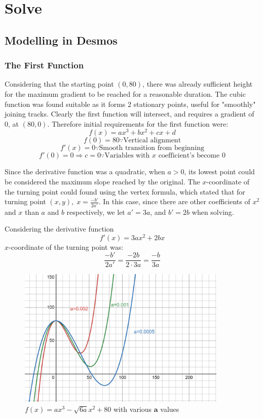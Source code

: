 \documentclass[10pt, letterpaper]{article}
\begin{document}
\section{Solve}
\subsection{Modelling in Desmos}
\subsubsection{The First Function}

Considering that the starting point $(0, 80)$, there was already sufficient height for the maximum gradient to be reached for a reasonable duration.
The cubic function was found suitable as it forms 2 stationary points, useful for "smoothly" joining tracks.
Clearly the first function will intersect, and requires a gradient of $0$, at $(80, 0)$. Therefore initial requirements for the first function were:
$$f(x)=ax^3 +bx^2 +cx +d$$
$$f(0)=80\because\textrm{Vertical alignment}$$
$$f'(x)=0 \because \textrm{Smooth transition from beginning}$$
$$f'(0)=0\Rightarrow c=0\because \textrm{Variables with } x \textrm{ coefficient's become 0}$$

Since the derivative function was a quadratic, when $a>0$, its lowest point could be considered the maximum slope reached by the original.
The $x$-coordinate of the turning point could found using the vertex formula, which stated that for turning point $(x, y),\; x=\frac{-b'}{2a'}$. In this case, since there are other coefficients of $x^2$ and $x$ than $a$ and $b$ respectively, we let $a'=3a$, and $b'=2b$ when solving.

Considering the derivative function
 $$f'(x)=3ax^2+2bx$$
 $x$-coordinate of the turning point was: 
 $$\frac{-b'}{2a'}=\frac{-2b}{2\cdot3a}=\frac{-b}{3a}$$



\begin{figure}[h!]
	\centering
	\includegraphics[width=10cm]{Eaxmple Cubic.png}
	\caption{$f(x)=ax^{3}-\sqrt{6a}x^{2}+80$ with various $\mathbf{a}$ values}
\end{figure}
\end{document}
